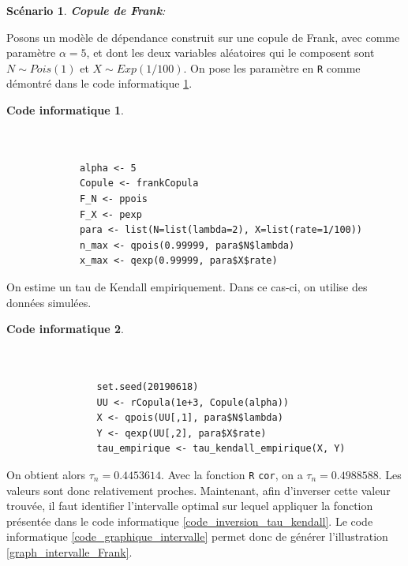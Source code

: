 \documentclass{article}
\newtheorem{code}{Code informatique}
\newtheorem{scenario}{Scénario}
\begin{document}
	 \clearpage
	 \begin{scenario}
	 	\textbf{Copule de Frank}:
	 	\label{scenario_Frank}
	 \end{scenario}
 	 Posons un modèle de dépendance construit sur une copule de Frank, avec comme paramètre $\alpha = 5$, et dont les deux variables aléatoires qui le composent sont $N \sim Pois(1)$ et $X\sim Exp(1/100)$. 
 	 On pose les paramètre en \texttt{R} comme démontré dans le code informatique \ref{code_parametres}. \\
 	 
	 \begin{minipage}[H]{\linewidth}
 	 	\begin{code}\label{code_parametres}
	 	 \begin{verbatim}
	 	 
	 	 
		 	 alpha <- 5
		 	 Copule <- frankCopula
		 	 F_N <- ppois
		 	 F_X <- pexp
		 	 para <- list(N=list(lambda=2), X=list(rate=1/100))
		 	 n_max <- qpois(0.99999, para$N$lambda)
		 	 x_max <- qexp(0.99999, para$X$rate)
	 	 \end{verbatim}
	 	\end{code}
 	\end{minipage}

 	On estime un tau de Kendall empiriquement. Dans ce cas-ci, on utilise des données simulées.\\

	 \begin{minipage}[H]{\linewidth}
 	 	 	\begin{code}\label{code_simul}
	 		\begin{verbatim}
	 		
	 		
				set.seed(20190618)
				UU <- rCopula(1e+3, Copule(alpha))
				X <- qpois(UU[,1], para$N$lambda)
				Y <- qexp(UU[,2], para$X$rate)
				tau_empirique <- tau_kendall_empirique(X, Y)
	 		\end{verbatim}
 			\end{code}
 	\end{minipage}

 	On obtient alors $\tau_n = 0.4453614$. Avec la fonction \texttt{R} \texttt{cor}, on a $\tau_n = 0.4988588$. Les valeurs sont donc relativement proches. Maintenant, afin d'inverser cette valeur trouvée, il faut identifier l'intervalle optimal sur lequel appliquer la fonction présentée dans le code informatique \ref{code_inversion_tau_kendall}. Le code informatique \ref{code_graphique_intervalle} permet donc de générer l'illustration \ref{graph_intervalle_Frank}. \\
 	
\end{document}
